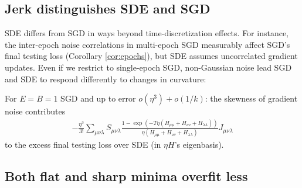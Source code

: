        \subsection{Jerk distinguishes SDE and SGD}
            SDE differs from SGD in ways beyond time-discretization effects.
            For instance, the inter-epoch noise correlations in multi-epoch SGD
            measurably affect SGD's final testing loss (Corollary
            \ref{cor:epochs}), but SDE assumes uncorrelated gradient updates.
            Even if we restrict to single-epoch SGD, 
            non-Gaussian noise lead SGD and SDE to respond differently to
            changes in curvature: 
            \begin{cor}[$\sdia{c(012-3)(03-13-23)}$] \label{cor:vsode}
                For $E=B=1$ SGD and up to error $o(\eta^3) + o(1/k)$:
                the skewness of gradient noise contributes  
                \begin{align*}
                    -\frac{\eta^3}{3!}
                    \sum_{\mu\nu\lambda}
                        S_{\mu\nu\lambda}
                        \frac{
                            1 - \exp(-T\eta (H_{\mu\mu} + H_{\nu\nu} + H_{\lambda\lambda}))
                        }{
                            \eta (H_{\mu\mu} + H_{\nu\nu} + H_{\lambda\lambda})
                        }
                        J_{\mu\nu\lambda}
                \end{align*}
                to the excess final testing loss over SDE (in $\eta H$'s eigenbasis).
            \end{cor}


       
        \subsection{Both flat and sharp minima overfit less}
            \label{subsect:curvature-and-overfitting}%

